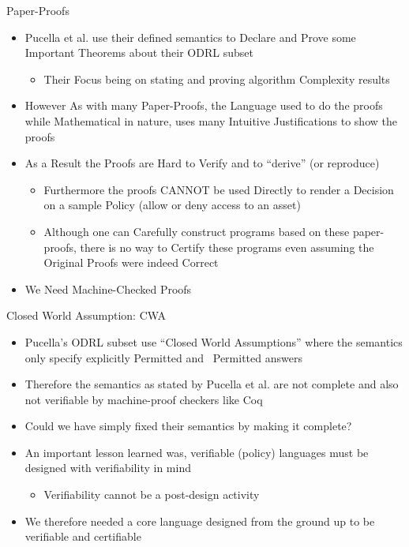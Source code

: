 \documentclass{beamer}
\begin{document}
\begin{frame}[fragile]{Paper-Proofs}
\begin{itemize}
\item Pucella et al. use their defined semantics to Declare and Prove some Important Theorems about their ODRL subset
\begin{itemize}
\item Their Focus being on stating and proving algorithm Complexity results
\end{itemize}
\item However As with many Paper-Proofs, the Language used to do the proofs while Mathematical in nature, uses many Intuitive Justifications to show the proofs
\item As a Result the Proofs are Hard to Verify and to ``derive'' (or reproduce)
\begin{itemize}
\item Furthermore the proofs CANNOT be used Directly to render a Decision on a sample Policy (allow or deny access to an asset)
\item Although one can Carefully construct programs based on these paper-proofs, there is no way to Certify these programs even assuming the Original Proofs were indeed Correct
\end{itemize}
\item We Need Machine-Checked Proofs
\end{itemize}
\end{frame}

\begin{frame}[fragile]{Closed World Assumption: CWA}
\begin{itemize}
  \item Pucella's ODRL subset use ``Closed World Assumptions'' where the semantics only specify explicitly Permitted and ~Permitted answers
  \item Therefore the semantics as stated by Pucella et al. are not complete and also not verifiable by machine-proof checkers like Coq
  \item Could we have simply fixed their semantics by making it complete?
  \item An important lesson learned was, verifiable (policy) languages must be designed with verifiability in mind
  \begin{itemize} 
    \item Verifiability cannot be a post-design activity 
  \end{itemize}
\item We therefore needed a core language designed from the ground up to be verifiable and certifiable
\end{itemize}
\end{frame}
\end{document}
